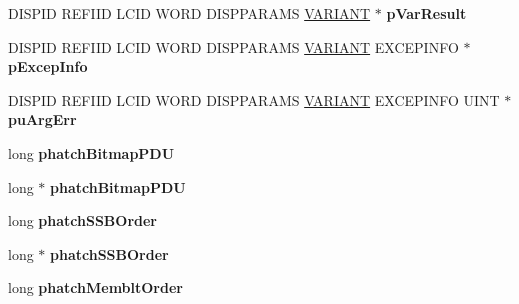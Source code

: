 \begin{DoxyCompactItemize}
D\+I\+S\+P\+ID R\+E\+F\+I\+ID L\+C\+ID W\+O\+RD D\+I\+S\+P\+P\+A\+R\+A\+MS \hyperlink{structtag_v_a_r_i_a_n_t}{V\+A\+R\+I\+A\+NT} $\ast$ {\bfseries p\+Var\+Result}
\item 
\mbox{\label{struct_m_s_t_s_c_lib_1_1_i_ms_tsc_debug_vtbl_a12db422300e5ecb673e20b56bbd14342}} 
D\+I\+S\+P\+ID R\+E\+F\+I\+ID L\+C\+ID W\+O\+RD D\+I\+S\+P\+P\+A\+R\+A\+MS \hyperlink{structtag_v_a_r_i_a_n_t}{V\+A\+R\+I\+A\+NT} E\+X\+C\+E\+P\+I\+N\+FO $\ast$ {\bfseries p\+Excep\+Info}
\item 
\mbox{\label{struct_m_s_t_s_c_lib_1_1_i_ms_tsc_debug_vtbl_a5b0ed6a28b2b20acf776b971420abc35}} 
D\+I\+S\+P\+ID R\+E\+F\+I\+ID L\+C\+ID W\+O\+RD D\+I\+S\+P\+P\+A\+R\+A\+MS \hyperlink{structtag_v_a_r_i_a_n_t}{V\+A\+R\+I\+A\+NT} E\+X\+C\+E\+P\+I\+N\+FO U\+I\+NT $\ast$ {\bfseries pu\+Arg\+Err}
\item 
\mbox{\label{struct_m_s_t_s_c_lib_1_1_i_ms_tsc_debug_vtbl_ae002ac09cd3fe774a4de21616867240f}} 
long {\bfseries phatch\+Bitmap\+P\+DU}
\item 
\mbox{\label{struct_m_s_t_s_c_lib_1_1_i_ms_tsc_debug_vtbl_a85c932f873f8a823fa733dca0ea772bb}} 
long $\ast$ {\bfseries phatch\+Bitmap\+P\+DU}
\item 
\mbox{\label{struct_m_s_t_s_c_lib_1_1_i_ms_tsc_debug_vtbl_a092b36237f59e0e5394866b58dea4a52}} 
long {\bfseries phatch\+S\+S\+B\+Order}
\item 
\mbox{\label{struct_m_s_t_s_c_lib_1_1_i_ms_tsc_debug_vtbl_a317006a2eeca8b0f5b0923182a98c218}} 
long $\ast$ {\bfseries phatch\+S\+S\+B\+Order}
\item 
\mbox{\label{struct_m_s_t_s_c_lib_1_1_i_ms_tsc_debug_vtbl_a91d4da585ad5d3213b45385861100a24}} 
long {\bfseries phatch\+Memblt\+Order}
\item 
\mbox{\label{struct_m_s_t_s_c_lib_1_1_i_ms_tsc_debug_vtbl_ad21fa73c7b5ea931ae1536c5fd46a9fc}} 

\end{DoxyCompactItemize}
